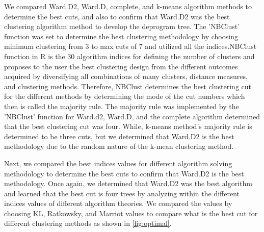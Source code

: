 \documentclass[10pt,twoside]{article}
\numberwithin{equation}{section}
\newcommand{\?}{\stackrel{?}{=}}
\begin{document}
We compared Ward.D2, Ward.D, complete, and k-means algorithm methods to determine the best cuts, and also to confirm that Ward.D2 was the best clustering algorithm method to develop the deprogram tree. The 'NBClust' function was set to determine the best clustering methodology by choosing minimum clustering from 3 to max cuts of 7 and utilized all the indices.NBClust function in R is the 30 algorithm indices for defining the number of clusters and proposes to the user the best clustering design from the different outcomes acquired by diversifying all combinations of many clusters, distance measures, and clustering methods.  Therefore, NBClust determines the best clustering cut for the different methods by determining the mode of the cut numbers which then is called the majority rule.
The majority rule was implemented by the 'NBClust' function for Ward.d2, Ward.D, and the complete algorithm determined that the best clustering cut was four. While, k-means method's majority rule is determined to be three cuts, but we determined that Ward.D2 is the best methodology due to the random nature of the k-mean clustering method. 

Next, we compared the best indices values for different algorithm solving methodology to determine the best cuts to confirm that Ward.D2 is the best methodology. Once again, we determined that Ward.D2 was the best algorithm and learned that the best cut is four trees by analyzing within the different indices values of different algorithm theories. We compared the values by choosing KL, Ratkowsky, and Marriot values to compare what is the best cut for different clustering methods as shown in \autoref{fig:optimal}. 
\end{document}
